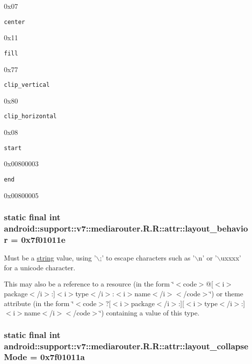 0x07

{\tt center}

0x11

{\tt fill}

0x77

{\tt clip\_\-vertical}

0x80

{\tt clip\_\-horizontal}

0x08

{\tt start}

0x00800003

{\tt end}

0x00800005\hypertarget{classandroid_1_1support_1_1v7_1_1mediarouter_1_1_r_1_1attr_8555c73e016a71372ba3e476e3416857}{
\subsubsection[{layout\_\-behavior}]{\setlength{\rightskip}{0pt plus 5cm}static final int android::support::v7::mediarouter.R.R::attr::layout\_\-behavior = 0x7f01011e}}
\label{classandroid_1_1support_1_1v7_1_1mediarouter_1_1_r_1_1attr_8555c73e016a71372ba3e476e3416857}


Must be a \hyperlink{classandroid_1_1support_1_1v7_1_1mediarouter_1_1_r_1_1string}{string} value, using '$\backslash$;' to escape characters such as '$\backslash$n' or '$\backslash$uxxxx' for a unicode character. 

This may also be a reference to a resource (in the form \char`\"{}$<$code$>$@\mbox{[}$<$i$>$package$<$/i$>$:\mbox{]}$<$i$>$type$<$/i$>$:$<$i$>$name$<$/i$>$$<$/code$>$\char`\"{}) or theme attribute (in the form \char`\"{}$<$code$>$?\mbox{[}$<$i$>$package$<$/i$>$:\mbox{]}\mbox{[}$<$i$>$type$<$/i$>$:\mbox{]}$<$i$>$name$<$/i$>$$<$/code$>$\char`\"{}) containing a value of this type. \hypertarget{classandroid_1_1support_1_1v7_1_1mediarouter_1_1_r_1_1attr_f2d5f9ae4316a92e410dee587b3badb1}{
\subsubsection[{layout\_\-collapseMode}]{\setlength{\rightskip}{0pt plus 5cm}static final int android::support::v7::mediarouter.R.R::attr::layout\_\-collapseMode = 0x7f01011a}}
\label{classandroid_1_1support_1_1v7_1_1mediarouter_1_1_r_1_1attr_f2d5f9ae4316a92e410dee587b3badb1}



